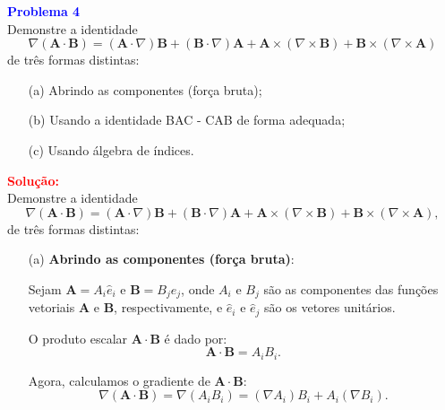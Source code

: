 \documentclass[a4paper,12pt]{article}
\begin{document}
\begin{flushleft}
\textbf{\textcolor{blue}{Problema 4}}\\
Demonstre a identidade
\begin{equation}
\nabla (\mathbf{A} \cdot \mathbf{B}) = (\mathbf{A} \cdot \nabla) \mathbf{B} + (\mathbf{B} \cdot \nabla) \mathbf{A} + \mathbf{A} \times (\nabla \times \mathbf{B}) + \mathbf{B} \times (\nabla \times \mathbf{A})
\end{equation}
de três formas distintas:
\begin{itemize}
    \item[(a)] Abrindo as componentes (força bruta);
    \item[(b)] Usando a identidade BAC - CAB de forma adequada;
    \item[(c)] Usando álgebra de índices.
\end{itemize}

\textcolor{red}{\textbf{Solução:}}\\
Demonstre a identidade
\begin{equation}
    \nabla (\mathbf{A} \cdot \mathbf{B}) = (\mathbf{A} \cdot \nabla) \mathbf{B} + (\mathbf{B} \cdot \nabla) \mathbf{A} + \mathbf{A} \times (\nabla \times \mathbf{B}) + \mathbf{B} \times (\nabla \times \mathbf{A}),
    \end{equation}
    de três formas distintas:
    
    \begin{itemize}
        \item[(a)] \textbf{Abrindo as componentes (força bruta)}:
        
        Sejam \( \mathbf{A} = A_i \hat{e}_i \) e \( \mathbf{B} = B_j \hat{e}_j \), onde \( A_i \) e \( B_j \) são as componentes das funções vetoriais \( \mathbf{A} \) e \( \mathbf{B} \), respectivamente, e \( \hat{e}_i \) e \( \hat{e}_j \) são os vetores unitários.
        
        O produto escalar \( \mathbf{A} \cdot \mathbf{B} \) é dado por:
        \begin{equation}
        \mathbf{A} \cdot \mathbf{B} = A_i B_i.
        \end{equation}
        
        Agora, calculamos o gradiente de \( \mathbf{A} \cdot \mathbf{B} \):
        \begin{equation}
        \nabla (\mathbf{A} \cdot \mathbf{B}) = \nabla (A_i B_i) = (\nabla A_i) B_i + A_i (\nabla B_i).
        \end{equation}
        

\end{itemize}
\end{flushleft}
\end{document}

